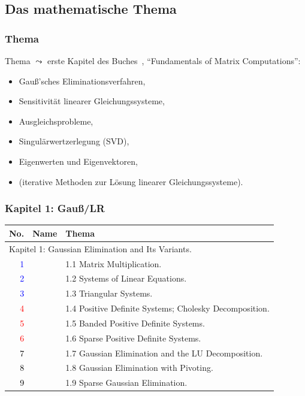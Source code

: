 \documentclass[10pt]{beamer} %
\begin{document}
\subsection{Das mathematische Thema}
\begin{frame}
  \frametitle{Thema}
  
  Thema $\leadsto$ erste Kapitel des Buches~\cite{Watkins:2002},
  “Fundamentals of Matrix Computations”:

  \vspace*{1em}

  \begin{itemize}[<+->]
  \item Gauß'sches Eliminationsverfahren,
  \item Sensitivität linearer Gleichungssysteme,
  \item Ausgleichsprobleme,
  \item Singulärwertzerlegung (SVD),
  \item Eigenwerten und Eigenvektoren,
  \item (iterative Methoden zur Lösung linearer Gleichungssysteme).
  \end{itemize}

\end{frame}
\begin{frame}
  \frametitle{Kapitel 1: Gauß/LR}

  \begin{tabular}{|r|l|l|}\hline
  \textbf{No.} & \textbf{Name} & \textbf{Thema} \\\hline
  \multicolumn{3}{|l|}{Kapitel 1: Gaussian Elimination and Its Variants.}\\\hline
    \textcolor{blue}{1}&&
  1.1 Matrix Multiplication.\\\hline
    \textcolor{blue}{2}&&
  1.2 Systems of Linear Equations.\\\hline
    \textcolor{blue}{3}&&
  1.3 Triangular Systems.\\\hline
    \textcolor{red}{4}&&
  1.4 Positive Definite Systems; Cholesky Decomposition.\\\hline
    \textcolor{red}{5}&&
  1.5 Banded Positive Definite Systems.\\\hline
    \textcolor{red}{6}&&
  1.6 Sparse Positive Definite Systems.\\\hline
    \textcolor{black}{7}&&
  1.7 Gaussian Elimination and the LU Decomposition.\\\hline
    \textcolor{black}{8}&&
  1.8 Gaussian Elimination with Pivoting.\\\hline
    \textcolor{black}{9}&&
  1.9 Sparse Gaussian Elimination.\\\hline
  \end{tabular}

\end{frame}
\end{document}
